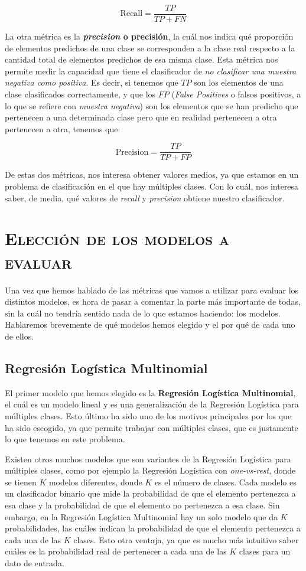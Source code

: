\documentclass[11pt,a4paper]{article}
\begin{document}
\[ 
\text{Recall} = \frac{TP}{TP + FN}
\]

La otra métrica es la \textbf{\textit{precision} o precisión}, la cuál nos indica qué proporción de elementos predichos de una clase se corresponden
a la clase real respecto a la cantidad total de elementos predichos de esa misma clase. Esta métrica nos permite medir la capacidad que tiene
el clasificador de \textit{no clasificar una muestra negativa como positiva}\cite{bib:precision}. Es decir, si tenemos que $TP$ son los
elementos de una clase clasificados correctamente, y que los $FP$ (\textit{False Positives} o falsos positivos, a lo que se refiere con
\textit{muestra negativa}) son los elementos que se han predicho que pertenecen a una determinada clase pero que en realidad pertenecen a
otra pertenecen a otra, tenemos que:

\[ 
\text{Precision} = \frac{TP}{TP + FP}
\]

De estas dos métricas, nos interesa obtener valores medios, ya que estamos en un problema de clasificación en el que hay múltiples clases.
Con lo cuál, nos interesa saber, de media, qué valores de \textit{recall} y \textit{precision} obtiene nuestro clasificador.

\section{\textsc{Elección de los modelos a evaluar}}

Una vez que hemos hablado de las métricas que vamos a utilizar para evaluar los distintos modelos, es hora de pasar a comentar la parte más
importante de todas, sin la cuál no tendría sentido nada de lo que estamos haciendo: los modelos. Hablaremos brevemente de qué modelos hemos
elegido y el por qué de cada uno de ellos.

\subsection{Regresión Logística Multinomial}

El primer modelo que hemos elegido es la \textbf{Regresión Logística Multinomial}, el cuál es un modelo lineal y es una generalización de la Regresión
Logística para múltiples clases. Esto último ha sido uno de los motivos principales por los que ha sido escogido, ya que permite trabajar con
múltiples clases, que es justamente lo que tenemos en este problema.

Existen otros muchos modelos que son variantes de la Regresión Logística para múltiples clases, como por ejemplo la Regresión Logística con
\textit{one-vs-rest}, donde se tienen $K$ modelos diferentes, donde $K$ es el número de clases. Cada modelo es un clasificador binario que
mide la probabilidad de que el elemento pertenezca a esa clase y la probabilidad de que el elemento no pertenezca a esa clase. Sin embargo,
en la Regresión Logística Multinomial hay un solo modelo que da $K$ probabilidades, las cuáles indican la probabilidad de que el elemento
pertenezca a cada una de las $K$ clases. Esto otra ventaja, ya que es mucho más intuitivo saber cuáles es la probabilidad real de pertenecer
a cada una de las $K$ clases para un dato de entrada.
\end{document}
